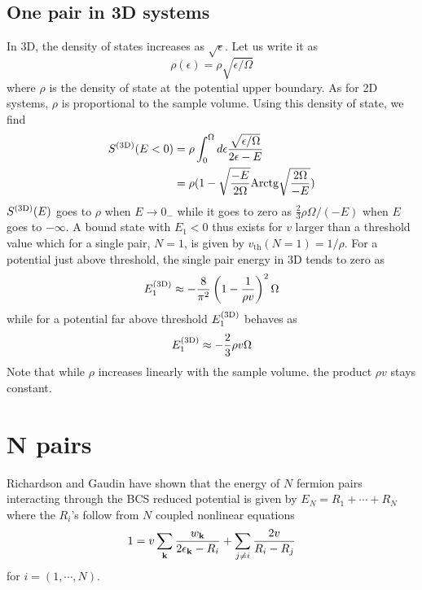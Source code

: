 \documentclass[3p,twocolumn]{elsarticle}
\begin{document}
\subsection{One pair in 3D systems}
In 3D, the density of states increases as $\sqrt{\epsilon}$. Let us write it as 
\begin{equation}
\rho(\epsilon)=\rho\sqrt{\epsilon/\Omega}
\label{eq:}
\end{equation}
where $\rho$ is the density of state at the potential upper boundary. As for 2D systems, $\rho$ is proportional to the sample volume.   Using this density of state, we find
\begin{equation}
\begin{split}
S^{{\text{(3D)}}}(E<0)&=\rho\int_0^{\Omega}{}d\epsilon\frac{\sqrt{\epsilon/\Omega}}{2\epsilon-E}\\
	&=\rho(1-\sqrt{\frac{-E}{2\Omega}}\text{Arctg}\sqrt{\frac{2\Omega}{-E}})
\label{eq:}
\end{split}
\end{equation}
$S^{{\text{(3D)}}}(E)$ goes to $\rho$ when $E\rightarrow0_-$ while it goes to zero as $\frac{2}{3}\rho\Omega/(-E)$ when $E$ goes to $-\infty$. 
A bound state with $E_1<0$ thus exists for $v$ larger than a threshold value which for a single pair, $N=1$, is given by  $v_{\text{th}}(N=1)=1/\rho$.  For a potential just above threshold, the single pair energy in 3D tends to zero as 
\begin{equation}
E_1^{{\text{(3D)}}}\approx-\frac{8}{\pi^2}\left(1-\frac{1}{\rho{}v}\right)^2\Omega
\label{eq:E3Dsmall}
\end{equation}
while for a potential far above threshold $E_1^{{\text{(3D)}}}$ behaves as 
\begin{equation}
E_1^{{\text{(3D)}}}\approx-\frac{2}{3}\rho{v}\Omega
\label{eq:E3Dlarge}
\end{equation}
Note that while $\rho$ increases linearly with the sample volume.  the product $\rho{v}$ stays constant. 

\section{N pairs\label{sec:NPair}}
Richardson \cite{Richardson1} and Gaudin \cite{gaudin} have shown that the energy of $N$ fermion pairs interacting through the BCS reduced potential  is  given by $E_N=R_1+\cdots+R_N$ where the $R_i$'s follow from $N$ coupled nonlinear equations 
\begin{equation}
 1=v\sum_{\mathbf{k}}\frac{w_{\mathbf{k}}}{2\epsilon_{\mathbf{k}}-R_i}+\sum_{j\neq{}i}\frac{2v}{R_i-R_j}
\end{equation}
{for} $i=(1,\cdots,N)$.
\end{document}
